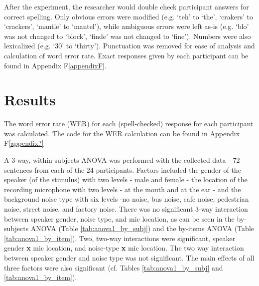 \documentclass[dissertation,copyright]{uathesis}
\begin{document}
After the experiment, the researcher would double check participant answers for correct spelling.  Only obvious errors were modified (e.g. `teh' to `the', `crakers' to `crackers', `mantle' to `mantel'), while ambiguous errors were left as-is (e.g. `blo' was not changed to `block', `finde' was not changed to `fine').  Numbers were also lexicalized (e.g. `30' to `thirty').  Punctuation was removed for ease of analysis and calculation of word error rate.  Exact responses given by each participant can be found in Appendix F\ref{appendixF}.


\section{Results}
\label{ch4:results}



The word error rate (WER) for each (spell-checked) response for each participant was calculated. The code for the WER calculation can be found in Appendix F\ref{appendix?}

A 3-way, within-subjects ANOVA was performed with the collected data - 72 sentences from each of the 24 participants. Factors included the gender of the speaker (of the stimulus) with two levels - male and female - the location of the recording microphone with two levels - at the mouth and at the ear - and the background noise type with six levels -no noise, bus noise, cafe noise, pedestrian noise, street noise, and factory noise.  There was no significant 3-way interaction between speaker gender, noise type, and mic location, as can be seen in the by-subjects ANOVA (Table \ref{tab:anova1_by_subj}) and the by-items ANOVA (Table \ref{tab:anova1_by_item}). Two, two-way interactions were significant, speaker gender \textbf{x} mic location, and noise-type \textbf{x} mic location. The two way interaction between speaker gender and noise type was not significant.  The main effects of all three factors were also significant (cf. Tables \ref{tab:anova1_by_subj} and \ref{tab:anova1_by_item}).
\end{document}

